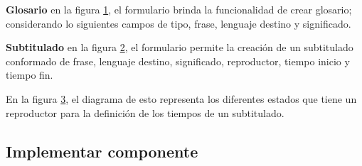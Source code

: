 \textbf{Glosario} en la figura \ref{fig:Formulario de registro para glosario}, el
formulario brinda la funcionalidad de crear glosario; considerando lo
siguientes campos de tipo, frase, lenguaje destino y significado.

\begin{figure}[!ht]
	\centering
	\label{fig:Formulario de registro para glosario}
\end{figure}

\textbf{Subtitulado} en la figura \ref{fig:Formulario de registro para subtitulado},
el formulario permite la creación de un subtitulado conformado de frase, lenguaje
destino, significado, reproductor, tiempo inicio y tiempo fin.

\begin{figure}[H]
	\centering
	\label{fig:Formulario de registro para subtitulado}
\end{figure}

En la figura \ref{fig:Diagrama de estado para subtitulado}, el diagrama de
esto representa los diferentes estados que tiene un reproductor para la
definición de los tiempos de un subtitulado. 

\begin{figure}[!ht]
	\centering
	\label{fig:Diagrama de estado para subtitulado}
\end{figure}

\subsection{Implementar componente}

